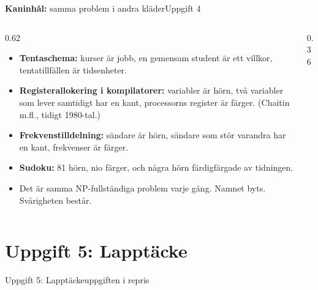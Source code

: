 \documentclass[aspectratio=169,10pt]{beamer}
\newcommand{\rabbit}{\textcolor{warnorange}{\textbf{Kaninhål:}} }
\begin{document}
\begin{frame}{\rabbit samma problem i andra kläder}{Uppgift 4}
  \begin{columns}[T]
    \begin{column}{0.62\textwidth}
      \begin{itemize}
        \item<1-> \textbf{Tentaschema:} kurser är jobb, en gemensam student är ett villkor, tentatillfällen är tidsenheter.
        \item<2-> \textbf{Registerallokering i kompilatorer:} variabler är hörn, två variabler som lever samtidigt har en kant, processorns register är färger. (Chaitin m.fl., tidigt 1980-tal.)
        \item<3-> \textbf{Frekvenstilldelning:} sändare är hörn, sändare som stör varandra har en kant, frekvenser är färger.
        \item<4-> \textbf{Sudoku:} 81 hörn, nio färger, och några hörn färdigfärgade av tidningen.
        \item<5-> Det är samma NP-fullständiga problem varje gång. Namnet byts. Svårigheten består.
      \end{itemize}
    \end{column}
    \begin{column}{0.36\textwidth}
    \end{column}
  \end{columns}
\end{frame}

\section{Uppgift 5: Lapptäcke}

\begin{frame}{Uppgift 5: Lapptäcke}{uppgiften i repris}
  \uppgiftFem
\end{frame}
\end{document}

